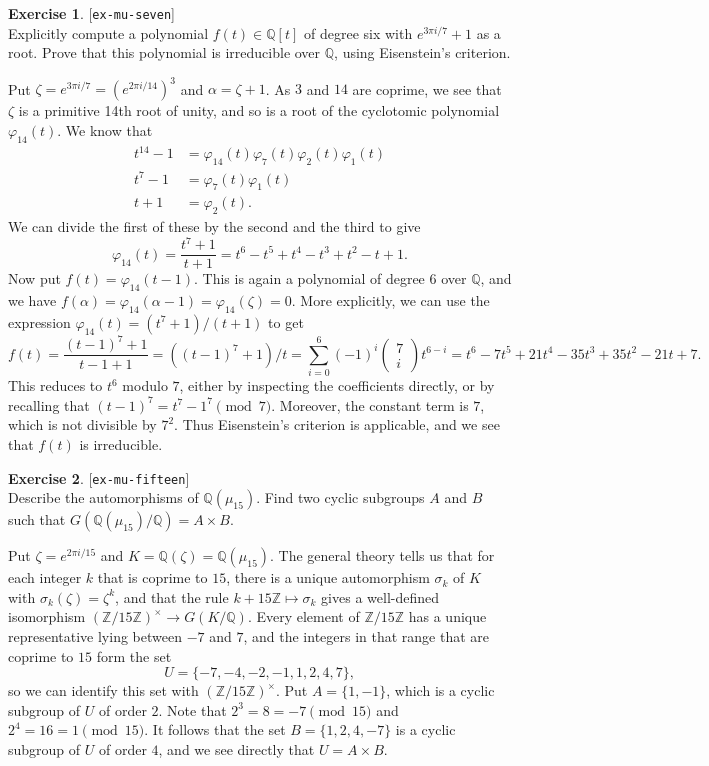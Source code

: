 \documentclass{amsart}
\newcommand{\Z}         {{\mathbb{Z}}}
\newcommand{\Q}         {{\mathbb{Q}}}
\newcommand{\al}        {\alpha}
\newcommand{\zt}        {\zeta}
\newcommand{\sg}        {\sigma}
\newcommand{\vph}       {\varphi}
\newcommand{\tm}        {\times}
\newcommand{\bcf}[2]{\left(\begin{array}{c}{#1}\\{#2}\end{array}\right)}
\renewcommand{\:}{\colon}
\newcommand{\lastexlabel}{}
\newcommand{\exlabel}[1]{
 \global\def\lastexlabel{#1}\label{#1}[\texttt{#1}]\ \\
}
\newcommand{\exlabel}[1]{
 \global\def\lastexlabel{#1}\label{#1}
}
\newenvironment{solution}{\SolutionInline}{\endSolutionInline}
\theoremstyle{definition}
\newtheorem{exercise}{Exercise}[section]
\renewenvironment{solution}{\SolutionAtEnd}{\endSolutionAtEnd}
\begin{document}
\begin{exercise}\exlabel{ex-mu-seven}
 Explicitly compute a polynomial $f(t)\in\Q[t]$ of degree six with
 $e^{3\pi i/7}+1$ as a root.  Prove that this polynomial is
 irreducible over $\Q$, using Eisenstein's criterion.
\end{exercise}
\begin{solution}
 Put $\zt=e^{3\pi i/7}=(e^{2\pi i/14})^3$ and
 $\al=\zt+1$.  As $3$ and $14$ are coprime, we see that $\zt$ is a
 primitive 14th root of unity, and so is a root of the cyclotomic
 polynomial $\vph_{14}(t)$.  We know that
 \begin{align*}
  t^{14}-1 &= \vph_{14}(t)\vph_7(t)\vph_2(t)\vph_1(t) \\
  t^7 - 1  &= \vph_7(t)\vph_1(t) \\
  t+1      &= \vph_2(t).
 \end{align*}
 We can divide the first of these by the second and the third to give
 \[ \vph_{14}(t) = 
    \frac{t^7+1}{t+1} = t^6-t^5+t^4-t^3+t^2-t+1.
 \]
 Now put $f(t)=\vph_{14}(t-1)$.  This is again a polynomial of degree
 $6$ over $\Q$, and we have
 $f(\al)=\vph_{14}(\al-1)=\vph_{14}(\zt)=0$.  More explicitly, we can
 use the expression $\vph_{14}(t)=(t^7+1)/(t+1)$ to get
 \[ f(t) = \frac{(t-1)^7+1}{t-1+1} = 
     ((t-1)^7+1)/t = \sum_{i=0}^6 (-1)^i\bcf{7}{i} t^{6-i} =
      t^6-7t^5+21t^4-35t^3+35t^2-21t+7.
 \]
 This reduces to $t^6$ modulo $7$, either by inspecting the
 coefficients directly, or by recalling that
 $(t-1)^7=t^7-1^7\pmod{7}$.  Moreover, the constant term is $7$, which
 is not divisible by $7^2$.  Thus Eisenstein's criterion is
 applicable, and we see that $f(t)$ is irreducible.
\end{solution}

\begin{exercise}\exlabel{ex-mu-fifteen}
 Describe the automorphisms of $\Q(\mu_{15})$.  Find two cyclic
 subgroups $A$ and $B$ such that $G(\Q(\mu_{15})/\Q)=A\tm B$.
\end{exercise}
\begin{solution}
 Put $\zt=e^{2\pi i/15}$ and $K=\Q(\zt)=\Q(\mu_{15})$.  The general
 theory tells us that for each integer $k$ that is coprime to $15$,
 there is a unique automorphism $\sg_k$ of $K$ with
 $\sg_k(\zt)=\zt^k$, and that the rule $k+15\Z\mapsto\sg_k$ gives a
 well-defined isomorphism $(\Z/15\Z)^\tm\to G(K/\Q)$.  Every element
 of $\Z/15\Z$ has a unique representative lying between $-7$ and $7$,
 and the integers in that range that are coprime to $15$ form the set
 \[ U = \{-7,-4,-2,-1,1,2,4,7\}, \]
 so we can identify this set with $(\Z/15\Z)^\tm$.  Put $A=\{1,-1\}$,
 which is a cyclic subgroup of $U$ of order $2$.  Note that
 $2^3=8=-7\pmod{15}$ and $2^4=16=1\pmod{15}$.  It follows that the set
 $B=\{1,2,4,-7\}$ is a cyclic subgroup of $U$ of order $4$, and we see
 directly that $U=A\tm B$.
\end{solution}
\end{document}
